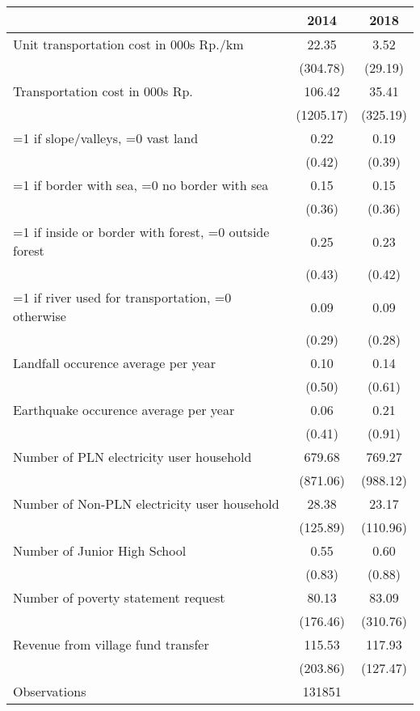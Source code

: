 \begin{tabular}{l*{2}{c}}
\hline\hline
                    &        2014&        2018\\
\hline
Unit transportation cost in 000s Rp./km&       22.35&        3.52\\
                    &    (304.78)&     (29.19)\\
Transportation cost in 000s Rp.&      106.42&       35.41\\
                    &   (1205.17)&    (325.19)\\
=1 if slope/valleys, =0 vast land&        0.22&        0.19\\
                    &      (0.42)&      (0.39)\\
=1 if border with sea, =0 no border with sea&        0.15&        0.15\\
                    &      (0.36)&      (0.36)\\
=1 if inside or border with forest, =0 outside forest&        0.25&        0.23\\
                    &      (0.43)&      (0.42)\\
=1 if river used for transportation, =0 otherwise&        0.09&        0.09\\
                    &      (0.29)&      (0.28)\\
Landfall occurence average per year&        0.10&        0.14\\
                    &      (0.50)&      (0.61)\\
Earthquake occurence average per year&        0.06&        0.21\\
                    &      (0.41)&      (0.91)\\
Number of PLN electricity user household&      679.68&      769.27\\
                    &    (871.06)&    (988.12)\\
Number of Non-PLN electricity user household&       28.38&       23.17\\
                    &    (125.89)&    (110.96)\\
Number of Junior High School&        0.55&        0.60\\
                    &      (0.83)&      (0.88)\\
Number of poverty statement request&       80.13&       83.09\\
                    &    (176.46)&    (310.76)\\
Revenue from village fund transfer&      115.53&      117.93\\
                    &    (203.86)&    (127.47)\\
\hline
Observations        &      131851&            \\
\hline\hline
\end{tabular}
